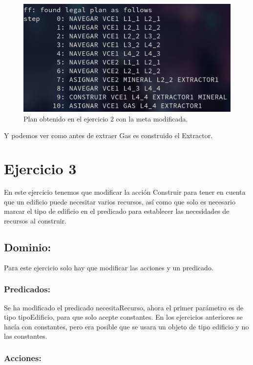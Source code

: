 \documentclass[10pt, spanish]{article}
\begin{document}
\begin{figure}[H]
	\centering
	\includegraphics[scale=0.4]{plan2Gas.png}
	\caption{Plan obtenido en el ejercicio 2 con la meta modificada.}
	\label{plan2Gas}
\end{figure}

Y podemos ver como antes de extraer Gas es construido el Extractor.

\section{Ejercicio 3}

En este ejercicio tenemos que modificar la acción Construir para tener en cuenta que un edificio puede necesitar varios recursos, así como que solo es necesario marcar el tipo de edificio en el predicado para establecer las necesidades de recursos al construir.

\subsection{Dominio:}

Para este ejercicio solo hay que modificar las acciones y un predicado.

\subsubsection{Predicados:}

Se ha modificado el predicado necesitaRecurso, ahora el primer parámetro es de tipo tipoEdificio, para que solo acepte constantes. En los ejercicios anteriores se hacía con constantes, pero era posible que se usara un objeto de tipo edificio y no las constantes.

\subsubsection{Acciones:}
\end{document}
